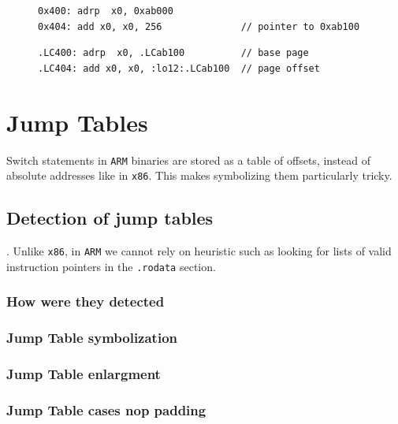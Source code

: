 \documentclass[a4paper,11pt,oneside]{report}
\newcommand{\todo}[1]{%
	\begingroup 
	\sethlcolor{cyan}%
	\hl{TODO: #1}%
	\endgroup
}
\begin{document}
\begin{figure}[h]
\label{lst:construction}
\begin{minipage}{\textwidth}
\begin{lstlisting}[basicstyle=\ttfamily\small]
0x400: adrp  x0, 0xab000
0x404: add x0, x0, 256              // pointer to 0xab100
\end{lstlisting}
\end{minipage}

\begin{minipage}{\textwidth}
	\begin{lstlisting}[basicstyle=\ttfamily\small]
.LC400: adrp  x0, .LCab100          // base page 
.LC404: add x0, x0, :lo12:.LCab100  // page offset
\end{lstlisting}

\end{minipage}
\end{figure}



\section{Jump Tables}

Switch statements in \texttt{ARM} binaries are stored as a table of offsets, instead of absolute addresses like in \texttt{x86}. This makes symbolizing them particularly tricky. 

\subsection{Detection of jump tables}.
Unlike \texttt{x86}, in \texttt{ARM} we cannot rely on heuristic such as looking for 
lists of valid instruction pointers in the \texttt{.rodata} section. 


\subsubsection{How were they detected}
\subsubsection{Jump Table symbolization}
\subsubsection{Jump Table enlargment}
\subsubsection{Jump Table cases nop padding}
\end{document}
